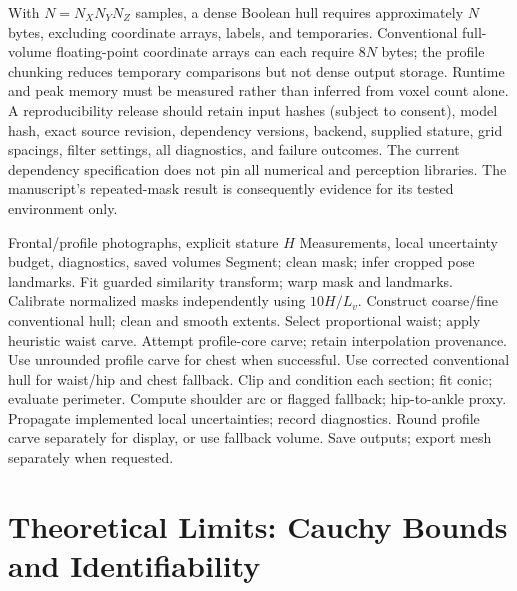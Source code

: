\documentclass[journal]{IEEEtran}
\begin{document}
With $N=N_XN_YN_Z$ samples, a dense Boolean hull requires approximately $N$ bytes, excluding coordinate arrays, labels, and temporaries. Conventional full-volume floating-point coordinate arrays can each require $8N$ bytes; the profile chunking reduces temporary comparisons but not dense output storage. Runtime and peak memory must be measured rather than inferred from voxel count alone. A reproducibility release should retain input hashes (subject to consent), model hash, exact source revision, dependency versions, backend, supplied stature, grid spacings, filter settings, all diagnostics, and failure outcomes. The current dependency specification does not pin all numerical and perception libraries. The manuscript's repeated-mask result is consequently evidence for its tested environment only.

\begin{algorithm}[!t]
\caption{Implemented Two-Branch Anthropometry Pipeline}
\label{alg:implemented_pipeline}
\begin{algorithmic}[1]
\REQUIRE Frontal/profile photographs, explicit stature $H$
\ENSURE Measurements, local uncertainty budget, diagnostics, saved volumes
\STATE Segment; clean mask; infer cropped pose landmarks.
\STATE Fit guarded similarity transform; warp mask and landmarks.
\ENDFOR
\STATE Calibrate normalized masks independently using $10H/L_v$.
\STATE Construct coarse/fine conventional hull; clean and smooth extents.
\STATE Select proportional waist; apply heuristic waist carve.
\STATE Attempt profile-core carve; retain interpolation provenance.
\STATE Use unrounded profile carve for chest when successful.
\STATE Use corrected conventional hull for waist/hip and chest fallback.
\STATE Clip and condition each section; fit conic; evaluate perimeter.
\STATE Compute shoulder arc or flagged fallback; hip-to-ankle proxy.
\STATE Propagate implemented local uncertainties; record diagnostics.
\STATE Round profile carve separately for display, or use fallback volume.
\STATE Save outputs; export mesh separately when requested.
\end{algorithmic}
\end{algorithm}


\section{Theoretical Limits: Cauchy Bounds and Identifiability}
\label{sec:theoretical_bounds}
\end{document}
